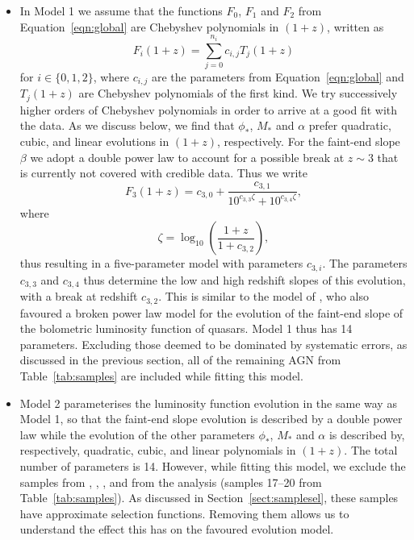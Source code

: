 \documentclass[fleqn,usenatbib]{mnras}
\begin{document}
\begin{itemize}

\item
  In Model 1 we assume that the functions $F_0$, $F_1$ and $F_2$ from
  Equation~\eqref{eqn:global} are Chebyshev polynomials in
  $\left(1+z\right)$, written as
  \begin{equation}
    F_i\left(1+z\right)=\sum_{j=0}^{n_i}c_{i,j}T_j\left(1+z\right)
    \label{eqn:cbs}
  \end{equation}
  for $i\in\{0,1,2\}$, where $c_{i,j}$ are the parameters from
  Equation~\eqref{eqn:global} and $T_j\left(1+z\right)$ are Chebyshev
  polynomials of the first kind. We try successively higher orders of
  Chebyshev polynomials in order to arrive at a good fit with the
  data.  As we discuss below, we find that $\phi_*$, $M_*$ and
  $\alpha$ prefer quadratic, cubic, and linear evolutions in
  $\left(1+z\right)$, respectively.  For the faint-end slope $\beta$
  we adopt a double power law to account for a possible break at
  $z\sim 3$ that is currently not covered with credible data.  Thus we
  write
  \begin{equation}
    F_3\left(1+z\right)=c_{3,0}+\frac{c_{3,1}}{10^{c_{3,3}\zeta}+10^{c_{3,4}\zeta}},
    \label{eqn:beta}
  \end{equation}
  where
  \begin{equation}
    \zeta = \log_{10}\left(\frac{1+z}{1+c_{3,2}}\right),
  \end{equation}
  thus resulting in a five-parameter model with parameters $c_{3,i}$.
  The parameters $c_{3,3}$ and $c_{3,4}$ thus determine the low and
  high redshift slopes of this evolution, with a break at redshift
  $c_{3,2}$.  This is similar to the model of
  \citet{2007ApJ...654..731H}, who also favoured a broken power law
  model for the evolution of the faint-end slope of the bolometric
  luminosity function of quasars.  Model 1 thus has 14 parameters.
  Excluding those deemed to be dominated by systematic errors, as
  discussed in the previous section, all of the remaining AGN from
  Table~\ref{tab:samples} are included while fitting this model.

\item Model 2 parameterises the luminosity function evolution in the
  same way as Model 1, so that the faint-end slope evolution is
  described by a double power law while the evolution of the other
  parameters $\phi_*$, $M_*$ and $\alpha$ is described by,
  respectively, quadratic, cubic, and linear polynomials in $(1+z)$.
  The total number of parameters is 14.  However, while fitting this
  model, we exclude the samples from \citet{2015AA...578A..83G},
  \citet{2011Natur.474..616M}, \citet{2015ApJ...801L..11V}, and
  \citet{2018Natur.553..473B} from the analysis (samples 17--20 from
  Table~\ref{tab:samples}).  As discussed in
  Section~\ref{sect:samplesel}, these samples have approximate
  selection functions.  Removing them allows us to understand the
  effect this has on the favoured evolution model.


\end{itemize}
\end{document}
